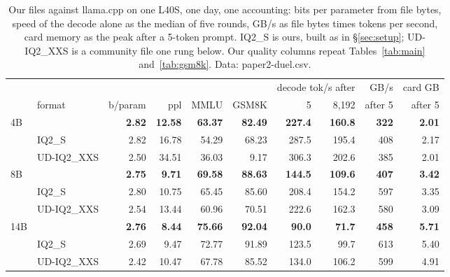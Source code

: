 \begin{table}[t]
\centering\small\setlength{\tabcolsep}{3.5pt}
\caption{Our files against llama.cpp on one L40S, one day, one accounting:
bits per parameter from file bytes, speed of the decode alone as the median of
five rounds, GB/s as file bytes times tokens per second, card memory as the
peak after a 5-token prompt. IQ2\_S is ours, built as in \S\ref{sec:setup};
UD-IQ2\_XXS is a community file one rung below. Our quality columns repeat
Tables~\ref{tab:main} and~\ref{tab:gsm8k}. Data: paper2-duel.csv.}
\label{tab:duel}
\begin{tabular}{llrrrrrrrr}
\toprule
 & & & & & & \multicolumn{2}{c}{decode tok/s after} & GB/s & card GB\\
 & format & b/param & ppl & MMLU & GSM8K & 5 & 8{,}192 & after 5 & after 5\\
\midrule
\multirow{3}{*}{4B}
 & \textbf{\Tetra{}} & \textbf{2.82} & \textbf{12.58} & \textbf{63.37} & \textbf{82.49} & \textbf{227.4} & \textbf{160.8} & \textbf{322} & \textbf{2.01}\\
 & IQ2\_S & 2.82 & 16.78 & 54.29 & 68.23 & 287.5 & 195.4 & 408 & 2.17\\
 & \textcolor{okGray}{UD-IQ2\_XXS} & \textcolor{okGray}{2.50} & \textcolor{okGray}{34.51} & \textcolor{okGray}{36.03} & \textcolor{okGray}{9.17} & \textcolor{okGray}{306.3} & \textcolor{okGray}{202.6} & \textcolor{okGray}{385} & \textcolor{okGray}{2.01}\\
\midrule
\multirow{3}{*}{8B}
 & \textbf{\Tetra{}} & \textbf{2.75} & \textbf{9.71} & \textbf{69.58} & \textbf{88.63} & \textbf{144.5} & \textbf{109.6} & \textbf{407} & \textbf{3.42}\\
 & IQ2\_S & 2.80 & 10.75 & 65.45 & 85.60 & 208.4 & 154.2 & 597 & 3.35\\
 & \textcolor{okGray}{UD-IQ2\_XXS} & \textcolor{okGray}{2.54} & \textcolor{okGray}{13.44} & \textcolor{okGray}{60.96} & \textcolor{okGray}{70.51} & \textcolor{okGray}{222.6} & \textcolor{okGray}{162.3} & \textcolor{okGray}{580} & \textcolor{okGray}{3.09}\\
\midrule
\multirow{3}{*}{14B}
 & \textbf{\Tetra{}} & \textbf{2.76} & \textbf{8.44} & \textbf{75.66} & \textbf{92.04} & \textbf{90.0} & \textbf{71.7} & \textbf{458} & \textbf{5.71}\\
 & IQ2\_S & 2.69 & 9.47 & 72.77 & 91.89 & 123.5 & 99.7 & 613 & 5.40\\
 & \textcolor{okGray}{UD-IQ2\_XXS} & \textcolor{okGray}{2.42} & \textcolor{okGray}{10.47} & \textcolor{okGray}{67.78} & \textcolor{okGray}{85.52} & \textcolor{okGray}{134.0} & \textcolor{okGray}{106.2} & \textcolor{okGray}{599} & \textcolor{okGray}{4.91}\\
\bottomrule
\end{tabular}
\end{table}

